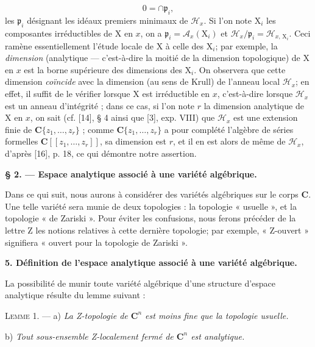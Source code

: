 \begin{equation*}
0 = \cap \mathfrak{p}_i,
\end{equation*}
les $\mathfrak{p}_i$ désignant les idéaux premiers minimaux de $\mathcal{H}_x$. Si l'on note $\mathrm{X}_i$ les composantes irréductibles de $\mathrm{X}$ en $x$, on a $\mathfrak{p}_i = \mathcal{A}_x(\mathrm{X}_i)$ et $\mathcal{H}_x/\mathfrak{p}_i = \mathcal{H}_{x,\,\mathrm{X}_i}$. Ceci ramène essentiellement l'étude locale de $\mathrm{X}$ à celle des $\mathrm{X}_i$; par exemple, la \textit{dimension} (analytique --- c'est-à-dire la moitié de la dimension topologique) de $\mathrm{X}$ en $x$ est la borne supérieure des dimensions des $\mathrm{X}_i$. On observera que cette dimension \textit{coïncide} avec la dimension (au sens de Krull) de l'anneau local $\mathcal{H}_x$; en effet, il suffit de le vérifier lorsque $\mathrm{X}$ est irréductible en $x$, c'est-à-dire lorsque $\mathcal{H}_x$ est un anneau d'intégrité ; dans ce cas, si l'on note $r$ la dimension analytique de $\mathrm{X}$ en $x$, on sait (cf. [14], \S{} 4 ainsi que [3], exp. VIII) que $\mathcal{H}_x$ est une extension finie de $\mathbf{C}\{z_1, \ldots, z_r\}$ ; comme $\mathbf{C}\{z_1, \ldots, z_r\}$ a pour complété l'algèbre de séries formelles $\mathbf{C}[[z_1, \ldots, z_r]]$, sa dimension est $r$, et il en est alors de même de $\mathcal{H}_x$, d'après [16], p. 18, ce qui démontre notre assertion.


\begin{center}\bfseries \S{} 2. --- Espace analytique associé à une variété algébrique.\end{center}

Dans ce qui suit, nous aurons à considérer des variétés algébriques sur le corps $\mathbf{C}$. Une telle variété sera munie de deux topologies : la topologie « usuelle », et la topologie « de Zariski ». Pour éviter les confusions, nous ferons précéder de la lettre Z les notions relatives à cette dernière topologie; par exemple, « Z-ouvert » signifiera « ouvert pour la topologie de Zariski ».


\textbf{5. Définition de l'espace analytique associé à une variété algébrique.}

La possibilité de munir toute variété algébrique d'une structure d'espace analytique résulte du lemme suivant :

\textsc{Lemme} 1. --- a) \textit{La Z-topologie de $\mathbf{C}^n$ est moins fine que la topologie usuelle.}

b) \textit{Tout sous-ensemble Z-localement fermé de $\mathbf{C}^n$ est analytique.}

